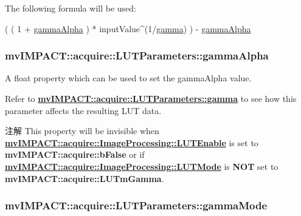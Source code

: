 The following formula will be used\+: 
\begin{DoxyCode}
( ( 1 + \hyperlink{classmv_i_m_p_a_c_t_1_1acquire_1_1_l_u_t_parameters_a03304551149637936cf265b33b5dbe2f}{gammaAlpha} ) * inputValue^(1/\hyperlink{classmv_i_m_p_a_c_t_1_1acquire_1_1_l_u_t_parameters_a3be2f11e6b176d9b9494116d992b2e00}{gamma}) ) - \hyperlink{classmv_i_m_p_a_c_t_1_1acquire_1_1_l_u_t_parameters_a03304551149637936cf265b33b5dbe2f}{gammaAlpha}
\end{DoxyCode}
 \hypertarget{classmv_i_m_p_a_c_t_1_1acquire_1_1_l_u_t_parameters_a03304551149637936cf265b33b5dbe2f}{
\subsubsection[{gamma\+Alpha}]{ mv\+I\+M\+P\+A\+C\+T\+::acquire\+::\+L\+U\+T\+Parameters\+::gamma\+Alpha}}\label{classmv_i_m_p_a_c_t_1_1acquire_1_1_l_u_t_parameters_a03304551149637936cf265b33b5dbe2f}


A float property which can be used to set the gamma\+Alpha value. 

Refer to {\bfseries \hyperlink{classmv_i_m_p_a_c_t_1_1acquire_1_1_l_u_t_parameters_a3be2f11e6b176d9b9494116d992b2e00}{mv\+I\+M\+P\+A\+C\+T\+::acquire\+::\+L\+U\+T\+Parameters\+::gamma}} to see how this parameter affects the resulting L\+U\+T data.

\begin{DoxyNote}{注解}
This property will be invisible when {\bfseries \hyperlink{classmv_i_m_p_a_c_t_1_1acquire_1_1_image_processing_a7f8eb83578d97fde3405e6ae5d09e5c3}{mv\+I\+M\+P\+A\+C\+T\+::acquire\+::\+Image\+Processing\+::\+L\+U\+T\+Enable}} is set to {\bfseries mv\+I\+M\+P\+A\+C\+T\+::acquire\+::b\+False} or if {\bfseries \hyperlink{classmv_i_m_p_a_c_t_1_1acquire_1_1_image_processing_ae2f3059a3574e6a08a2d4348f1d5a152}{mv\+I\+M\+P\+A\+C\+T\+::acquire\+::\+Image\+Processing\+::\+L\+U\+T\+Mode}} is {\bfseries N\+O\+T} set to {\bfseries mv\+I\+M\+P\+A\+C\+T\+::acquire\+::\+L\+U\+Tm\+Gamma}. 
\end{DoxyNote}
\hypertarget{classmv_i_m_p_a_c_t_1_1acquire_1_1_l_u_t_parameters_aa9859adce405ea020bad38f40d779034}{
\subsubsection[{gamma\+Mode}]{ mv\+I\+M\+P\+A\+C\+T\+::acquire\+::\+L\+U\+T\+Parameters\+::gamma\+Mode}}\label{classmv_i_m_p_a_c_t_1_1acquire_1_1_l_u_t_parameters_aa9859adce405ea020bad38f40d779034}



